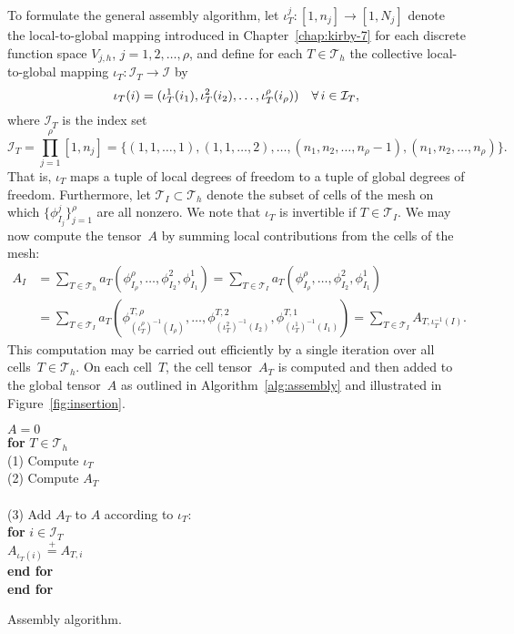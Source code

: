 To formulate the general assembly algorithm, let $\iota_T^j : [1,n_j]
\rightarrow [1,N_j]$ denote the local-to-global mapping introduced in
Chapter~\ref{chap:kirby-7} for each discrete function space $V_{j,h}$,
$j=1,2,\ldots,\rho$, and define for each $T \in \mathcal{T}_h$ the
collective local-to-global mapping $\iota_T : \mathcal{I}_T
\rightarrow \mathcal{I}$ by
\begin{equation}
  \iota_T(i) =
  (\iota_T^1(i_1),\iota_T^2(i_2),\ldots,\iota_T^{\rho}(i_{\rho}))
  \quad \forall\, i \in \mathcal{I}_T,
\end{equation}
where $\mathcal{I}_T$ is the index set
\begin{equation}
  \mathcal{I}_T =
  \prod_{j=1}^{\rho}[1,n_j] = \{(1,1,\ldots,1), (1,1,\ldots,2), \ldots,
  (n_1, n_2, \ldots, n_{\rho} - 1),
  (n_1, n_2, \ldots, n_{\rho})\}.
\end{equation}
That is, $\iota_T$ maps a tuple of local degrees of freedom to a tuple
of global degrees of freedom. Furthermore, let $\mathcal{T}_I \subset
\mathcal{T}_h$ denote the subset of cells of the mesh on which
$\{\phi_{I_j}^j\}_{j=1}^{\rho}$ are all nonzero. We note that
$\iota_T$ is invertible if $T \in \mathcal{T}_I$.  We may now compute
the tensor~$A$ by summing local contributions from the cells of the
mesh:
\begin{equation}
  \begin{split}
  A_I
  &=
  \sum_{T\in\mathcal{T}_h}
  a_T(\phi_{I_{\rho}}^{\rho}, \ldots, \phi_{I_2}^2, \phi_{I_1}^1)
  =
  \sum_{T\in\mathcal{T}_I}
  a_T(\phi_{I_{\rho}}^{\rho}, \ldots, \phi_{I_2}^2, \phi_{I_1}^1) \\
  &=
  \sum_{T\in\mathcal{T}_I}
  a_T(\phi_{(\iota_T^{\rho})^{-1}(I_{\rho})}^{T,{\rho}},
      \ldots,
      \phi_{(\iota_T^2)^{-1}(I_2)}^{T,2},
      \phi_{(\iota_T^1)^{-1}(I_1)}^{T,1})
  =
  \sum_{T\in\mathcal{T}_I}
  A_{T,{\iota_T^{-1}(I)}}.
  \end{split}
\end{equation}
This computation may be carried out efficiently by a single iteration
over all cells~$T \in \mathcal{T}_h$. On each cell~$T$, the cell
tensor~$A_T$ is computed and then added to the global tensor~$A$ as
outlined in Algorithm~\ref{alg:assembly} and illustrated in
Figure~\ref{fig:insertion}.
\begin{algorithm}
  \begin{tabbing}
    $A = 0$\\
    \textbf{for}  {$T \in \mathcal{T}_h$}\\
    \tab (1) Compute $\iota_T$ \\
    \tab (2) Compute $A_T$ \\ \\
    \tab (3) Add $A_T$ to $A$ according to $\iota_T$: \\
    \tab \textbf{for} $i \in \mathcal{I}_T$ \\
    \tab \tab $A_{\iota_T(i)} \stackrel{+}{=} A_{T,i}$ \\
    \tab \textbf{end for} \\
    \textbf{end for}
  \end{tabbing}
  \caption{Assembly algorithm.}
  \label{alg:assembly}
\end{algorithm}

